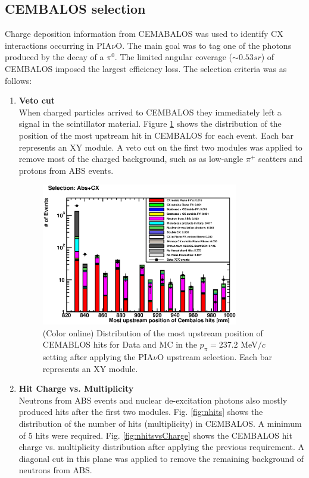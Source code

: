 \subsection{CEMBALOS selection}
Charge deposition information from CEMABALOS was used to identify CX interactions occurring in PIA$\nu$O. The main goal was to tag one of the photons produced by the decay of a $\pi^0$. The limited angular coverage ($\sim0.53 sr$) of CEMBALOS imposed the largest efficiency loss. The selection criteria was as follows:
\begin{enumerate}
\item{\bf Veto cut\\}
When charged particles arrived to CEMBALOS they immediately left a signal in the scintillator material. Figure \ref{fig:veto} shows the distribution of the position of the most upstream hit in CEMBALOS for each event. Each bar represents an XY module. A veto cut on the first two modules was applied to remove most of the charged background, such as as low-angle $\pi^+$ scatters and protons from ABS events.

\begin{figure}[ht]
 \includegraphics[width=86mm]{figures/duettag_fgdMostUp_10000.eps}
 \caption{(Color online) Distribution of the most upstream position of CEMABLOS hits for Data and MC in the $p_\pi=$237.2 MeV$/c$ setting after applying the PIA$\nu$O upstream selection. Each bar represents an XY module.}
 \label{fig:veto}
\end{figure}
   
\item{\bf Hit Charge vs. Multiplicity\\}
Neutrons from ABS events and nuclear de-excitation photons also mostly produced hits after the first two modules. Fig. \ref{fig:nhits} shows the distribution of the number of hits (multiplicity) in CEMBALOS. A minimum of 5 hits were required. Fig. \ref{fig:nhitsvsCharge} shows the CEMBALOS hit charge vs. multiplicity distribution after applying the previous requirement. A diagonal cut in this plane was applied to remove the remaining background of neutrons from ABS.
\end{enumerate}

